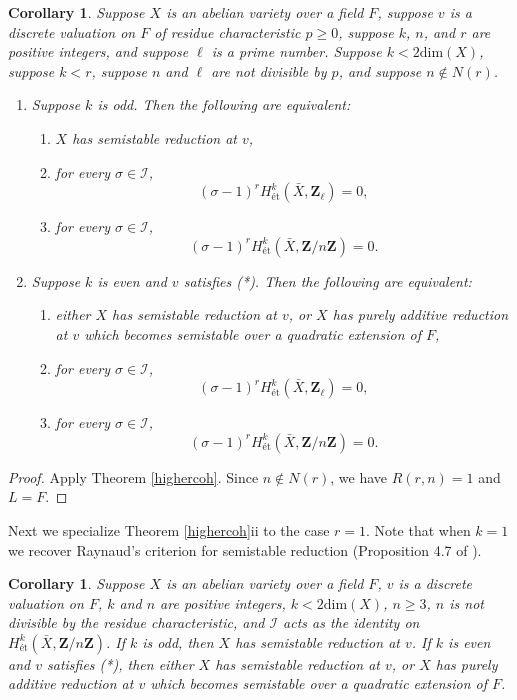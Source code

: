 \documentclass{amsart}
\def\Z{{\mathbf Z}}
\def\I{{\mathcal I}}
\def\dim{\mathrm{dim}}
\newtheorem{cor}[thm]{Corollary}
\theoremstyle{definition}
\begin{document}
\begin{cor}
\label{highercohcor}
Suppose $X$ is an abelian variety over a field $F$, 
suppose $v$ is a discrete valuation on $F$ of residue 
characteristic $p \ge 0$, suppose $k$, $n$, and $r$
are positive integers, and suppose $\ell$ is a prime number.
Suppose $k < 2\dim(X)$, 
suppose $k<r$, suppose $n$ and $\ell$ are not divisible by $p$, 
and suppose $n \notin N(r)$.
\begin{enumerate}
\item[{(i)}] Suppose $k$ is odd. Then the following are
equivalent:
\begin{enumerate}
\item[{(a)}]  $X$ has semistable reduction at $v$,
\item[{(b)}] for every $\sigma \in \I$,
$$(\sigma - 1)^{r}H^k_{\text{\'et}}({\bar X}, 
\Z_{\ell}) = 0,$$ 
\item[{(c)}]  for every $\sigma \in \I$,
$$(\sigma - 1)^{r}H^k_{\text{\'et}}({\bar X}, \Z/n\Z) = 0.$$ 
\end{enumerate}
\item[{(ii)}] Suppose $k$ is even and $v$ satisfies (*).
Then the following are equivalent:
\begin{enumerate}
\item[{(a)}]  either $X$ has semistable reduction at $v$, or
$X$ has purely additive reduction at $v$ which becomes
semistable over a quadratic extension of $F$,
\item[{(b)}] for every $\sigma \in \I$,
$$(\sigma - 1)^{r}H^k_{\text{\'et}}({\bar X}, \Z_{\ell}) = 
0,$$
\item[{(c)}] for every $\sigma \in \I$,
$$(\sigma - 1)^{r}H^k_{\text{\'et}}({\bar X}, \Z/n\Z) = 0.$$ 
\end{enumerate}
\end{enumerate}
\end{cor}

\begin{proof}
Apply Theorem \ref{highercoh}. 
Since $n \notin N(r)$, we have $R(r,n)=1$ and $L=F$.
\end{proof}

Next we specialize Theorem \ref{highercoh}ii to the case $r=1$.
Note that when $k=1$ we recover Raynaud's criterion for
semistable reduction (Proposition 4.7 of \cite{SGA7}).

\begin{cor}
\label{raynaudgen}
Suppose $X$ is an abelian variety over a field $F$, 
$v$ is a discrete valuation on $F$, 
$k$ and $n$ are positive integers, 
$k < 2\dim(X)$, $n \ge 3$, %
$n$ is not divisible by the residue characteristic, and
$\I$ acts as the identity on 
$H^k_{\text{\'et}}({\bar X}, \Z/n\Z)$.
If $k$ is odd, then $X$ has semistable reduction at $v$.
If $k$ is even and $v$ satisfies (*), 
then either $X$ has semistable reduction at $v$, or
$X$ has purely additive reduction at $v$ which becomes
semistable over a quadratic extension of $F$.
\end{cor}
\end{document}
